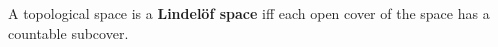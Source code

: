 A topological space is a \textbf{Lindelöf space} iff each open cover of the space has a countable subcover.
